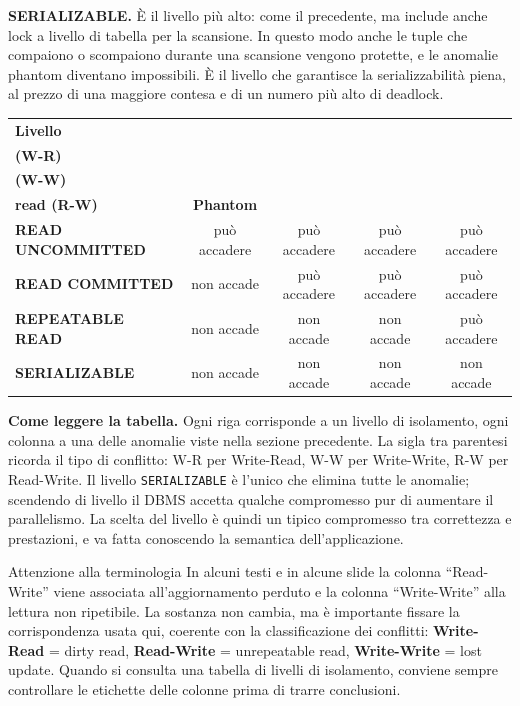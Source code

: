 \documentclass[12pt]{extarticle}
\begin{document}
\medskip
\noindent \textbf{SERIALIZABLE.} È il livello più alto: come il precedente, ma include anche lock a livello di tabella per la scansione. In questo modo anche le tuple che compaiono o scompaiono durante una scansione vengono protette, e le anomalie phantom diventano impossibili. È il livello che garantisce la serializzabilità piena, al prezzo di una maggiore contesa e di un numero più alto di deadlock.

\begin{center}
\small
\begin{tabular}{@{}lcccc@{}}
    \toprule
    \textbf{Livello} & \shortstack{\textbf{Dirty read}\\\textbf{(W-R)}} & \shortstack{\textbf{Lost update}\\\textbf{(W-W)}} & \shortstack{\textbf{Unrepeatable}\\\textbf{read (R-W)}} & \textbf{Phantom} \\
    \midrule
    \textbf{READ UNCOMMITTED} & può accadere & può accadere & può accadere & può accadere \\
    \addlinespace
    \textbf{READ COMMITTED}   & non accade   & può accadere & può accadere & può accadere \\
    \addlinespace
    \textbf{REPEATABLE READ}  & non accade   & non accade   & non accade   & può accadere \\
    \addlinespace
    \textbf{SERIALIZABLE}     & non accade   & non accade   & non accade   & non accade   \\
    \bottomrule
\end{tabular}
\end{center}

\noindent \textbf{Come leggere la tabella.} Ogni riga corrisponde a un livello di isolamento, ogni colonna a una delle anomalie viste nella sezione precedente. La sigla tra parentesi ricorda il tipo di conflitto: W-R per Write-Read, W-W per Write-Write, R-W per Read-Write. Il livello \texttt{SERIALIZABLE} è l'unico che elimina tutte le anomalie; scendendo di livello il DBMS accetta qualche compromesso pur di aumentare il parallelismo. La scelta del livello è quindi un tipico compromesso tra correttezza e prestazioni, e va fatta conoscendo la semantica dell'applicazione.

\begin{cbox}{Attenzione alla terminologia}
\noindent In alcuni testi e in alcune slide la colonna ``Read-Write'' viene associata all'aggiornamento perduto e la colonna ``Write-Write'' alla lettura non ripetibile. La sostanza non cambia, ma è importante fissare la corrispondenza usata qui, coerente con la classificazione dei conflitti: \textbf{Write-Read} = dirty read, \textbf{Read-Write} = unrepeatable read, \textbf{Write-Write} = lost update. Quando si consulta una tabella di livelli di isolamento, conviene sempre controllare le etichette delle colonne prima di trarre conclusioni.
\end{cbox}
\end{document}
